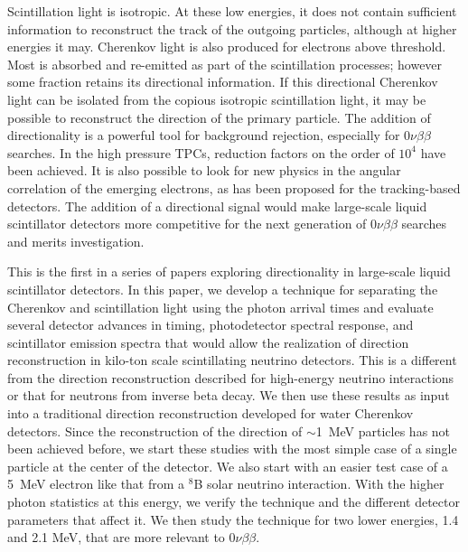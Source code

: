 \documentclass[cits]{JINST}
\begin{document}
Scintillation light is isotropic. At these low energies, it does not contain sufficient information to reconstruct the track of the outgoing particles, although at higher energies it may\cite{john}.  Cherenkov light is also
produced for electrons above threshold. Most is absorbed and re-emitted as part of the
scintillation processes; however some fraction retains its
directional information. If this directional Cherenkov light can be
isolated from the copious isotropic scintillation light, it may be
possible to reconstruct the direction of the primary particle. The addition of directionality is a powerful tool
for background rejection, especially for $0\nu\beta\beta$ searches. In the high pressure TPCs, reduction factors on the order of $10^4$ have been achieved\cite{Gotthard}. It is also possible to look for new physics in the angular correlation of the emerging electrons\cite{newphysics0nuBB}, as has been proposed for the tracking-based detectors\cite{SuperNEMO}. The addition of a directional signal would make large-scale liquid scintillator detectors more competitive for the next generation of $0\nu\beta\beta$ searches and merits investigation.

This is the first in a series of papers exploring directionality in large-scale liquid scintillator detectors. In this paper, we develop a technique for
separating the Cherenkov and scintillation light using the photon arrival
times and evaluate several detector advances in timing, photodetector 
spectral response, and scintillator emission spectra that would allow
the realization of direction reconstruction in kilo-ton scale
scintillating neutrino detectors. This is a different from the direction reconstruction described for high-energy neutrino interactions\cite{john} or that for neutrons from inverse beta decay\cite{chooz,dcDirection}.  We then use these results as input into a traditional direction reconstruction developed for water Cherenkov detectors. Since the reconstruction of the direction of $\sim$1~MeV particles has not been achieved before, we start these studies with the most simple case of a single particle at the center of the detector. We also start with an easier test case of a 5~MeV electron like that from a $^{8}$B solar neutrino interaction. With the higher photon statistics at this energy, we verify the technique and the different detector parameters that affect it. We then study the technique for two lower energies, 1.4 and 2.1 MeV, that are more relevant to $0\nu\beta\beta$.  
\end{document}
